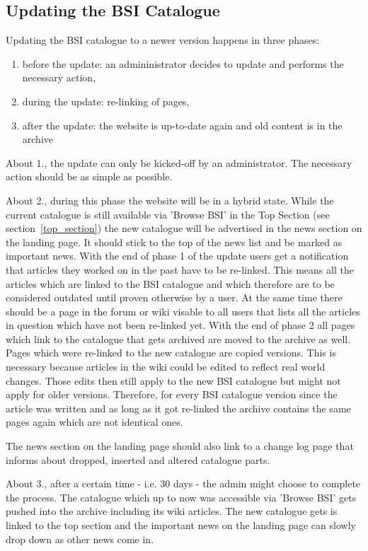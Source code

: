 \subsection{Updating the BSI Catalogue}
\begin{tcolorbox}[breakable,colback=red!14,colframe=red!40!black,title=UPDATE 19/11/2017]
Updating the BSI catalogue to a newer version happens in three phases:
\begin{enumerate}
    \item before the update: an admininistrator decides to update and performs the necessary action,
    \item during the update: re-linking of pages,
    \item after the update: the website is up-to-date again and old content is in the archive 
\end{enumerate}

About 1., the update can only be kicked-off by an administrator.
The necessary action should be as simple as possible. 

\bigskip

About 2., during this phase the website will be in a hybrid state.
While the current catalogue is still available via 'Browse BSI' in the Top Section (see section~\ref{top_section}) the new catalogue will be advertised in the news section on the landing page.
It should stick to the top of the news list and be marked as important news.
With the end of phase 1 of the update users get a notification that articles they worked on in the past have to be re-linked.
This means all the articles which are linked to the BSI catalogue and which therefore are to be considered outdated until proven otherwise by a user.
At the same time there should be a page in the forum or wiki visable to all users that lists all the articles in question which have not been re-linked yet.
With the end of phase 2 all pages which link to the catalogue that gets archived are moved to the archive as well.
Pages which were re-linked to the new catalogue are copied versions.
This is necessary because articles in the wiki could be edited to reflect real world changes. 
Those edits then still apply to the new BSI catalogue but might not apply for older versions.
Therefore, for every BSI catalogue version since the article was written and as long as it got re-linked the archive contains the same pages again which are not identical ones.
\medskip

The news section on the landing page should also link to a change log page that informs about dropped, inserted and altered catalogue parts. 
\bigskip

About 3., after a certain time - i.e. 30 days - the admin might choose to complete the process.
The catalogue which up to now was accessible via 'Browse BSI' gets pushed into the archive including its wiki articles.
The new catalogue gets is linked to the top section and the important news on the landing page can slowly drop down as other news come in.
\end{tcolorbox}


